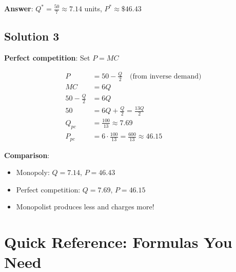 \documentclass[12pt]{article}
\begin{document}
\textbf{Answer}: $Q^* = \frac{50}{7} \approx 7.14$ units, $P^* \approx \$46.43$

\subsection{Solution 3}

\textbf{Perfect competition}: Set $P = MC$

\begin{align*}
P &= 50 - \frac{Q}{2} \quad \text{(from inverse demand)} \\
MC &= 6Q \\
50 - \frac{Q}{2} &= 6Q \\
50 &= 6Q + \frac{Q}{2} = \frac{13Q}{2} \\
Q_{pc} &= \frac{100}{13} \approx 7.69 \\
P_{pc} &= 6 \cdot \frac{100}{13} = \frac{600}{13} \approx 46.15
\end{align*}

\textbf{Comparison}:
\begin{itemize}
\item Monopoly: $Q = 7.14$, $P = 46.43$
\item Perfect competition: $Q = 7.69$, $P = 46.15$
\item Monopolist produces less and charges more!
\end{itemize}

\newpage

\section{Quick Reference: Formulas You Need}
\end{document}
